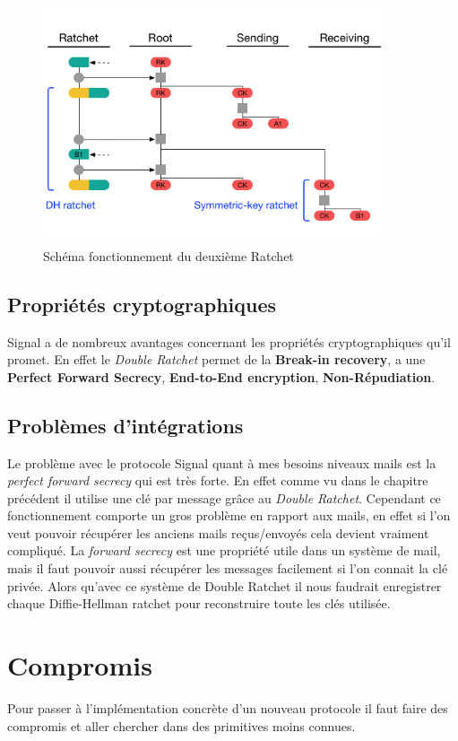 \begin{figure}[h!]
	\centering
	\includegraphics[width=10cm]{images/secondRatchet.png}
	\caption{Schéma fonctionnement du deuxième Ratchet\cite{doubleratchet}}
	\label{fig:signalSecond}
\end{figure}

\subsection{Propriétés cryptographiques}
Signal a de nombreux avantages concernant les propriétés cryptographiques qu'il promet. En effet le \textit{Double Ratchet} permet de la \textbf{Break-in recovery}, a une \textbf{Perfect Forward Secrecy}, \textbf{End-to-End encryption}, \textbf{Non-Répudiation}.
\subsection{Problèmes d'intégrations}
Le problème avec le protocole Signal quant à mes besoins niveaux mails est la \textit{perfect forward secrecy} qui est très forte. En effet comme vu dans le chapitre précédent il utilise une clé par message grâce au \textit{Double Ratchet}. Cependant ce fonctionnement comporte un gros problème en rapport aux mails, en effet si l'on veut pouvoir récupérer les anciens mails reçus/envoyés cela devient vraiment compliqué. La \textit{forward secrecy} est une propriété utile dans un système de mail, mais il faut pouvoir aussi récupérer les messages facilement si l'on connait la clé privée. Alors qu'avec ce système de Double Ratchet il nous faudrait enregistrer chaque Diffie-Hellman ratchet pour reconstruire toute les clés utilisée.
\section{Compromis}
Pour passer à l'implémentation concrète d'un nouveau protocole il faut faire des compromis et aller chercher dans des primitives moins connues.

